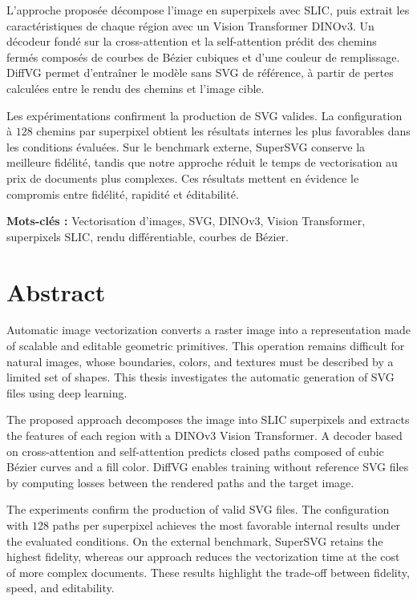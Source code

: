 \documentclass[12pt, a4paper, oneside]{report}
\begin{document}
L'approche proposée décompose l'image en superpixels avec SLIC, puis extrait les
caractéristiques de chaque région avec un Vision Transformer DINOv3. Un décodeur fondé sur
la cross-attention et la self-attention prédit des chemins fermés composés de courbes de Bézier
cubiques et d'une couleur de remplissage. DiffVG permet d'entraîner le modèle sans SVG de
référence, à partir de pertes calculées entre le rendu des chemins et l'image cible.

Les expérimentations confirment la production de SVG valides. La configuration à $128$
chemins par superpixel obtient les résultats internes les plus favorables dans les conditions
évaluées. Sur le benchmark externe, SuperSVG conserve la meilleure fidélité, tandis que notre
approche réduit le temps de vectorisation au prix de documents plus complexes. Ces résultats mettent en
évidence le compromis entre fidélité, rapidité et éditabilité.

\bigskip\noindent
\textbf{Mots-clés :} Vectorisation d'images, SVG, DINOv3, Vision Transformer,
superpixels SLIC, rendu différentiable, courbes de Bézier.

\newpage

\chapter*{Abstract}

Automatic image vectorization converts a raster image into a representation made of scalable
and editable geometric primitives. This operation remains difficult for natural images, whose
boundaries, colors, and textures must be described by a limited set of shapes. This thesis
investigates the automatic generation of SVG files using deep learning.

The proposed approach decomposes the image into SLIC superpixels and extracts the features
of each region with a DINOv3 Vision Transformer. A decoder based on cross-attention and
self-attention predicts closed paths composed of cubic Bézier curves and a fill color. DiffVG
enables training without reference SVG files by computing losses between the rendered paths
and the target image.

The experiments confirm the production of valid SVG files. The configuration with $128$
paths per superpixel achieves the most favorable internal results under the evaluated
conditions. On the external benchmark, SuperSVG retains the highest fidelity, whereas our
approach reduces the vectorization time at the cost of more complex documents. These results highlight the
trade-off between fidelity, speed, and editability.
\end{document}
